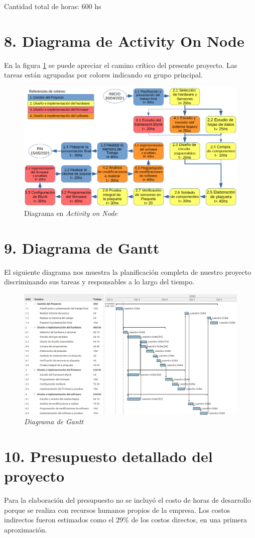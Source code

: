 \documentclass[
11pt, %
]{charter}
\begin{document}
Cantidad total de horas: 600 hs
\pagebreak
\section{8. Diagrama de Activity On Node}
\label{sec:AoN}
En la figura \ref{fig:AoN} se puede apreciar el camino crítico del presente proyecto. Las tareas están agrupadas por colores indicando su grupo principal.

\begin{figure}[htpb]
\centering 
\includegraphics[angle=90, width=.6\textwidth]{./Figuras/AoN.png}
\caption{Diagrama en \textit{Activity on Node}}
\label{fig:AoN}
\end{figure}

\section{9. Diagrama de Gantt}
\label{sec:gantt}

El siguiente diagrama nos muestra la planificación completa de nuestro proyecto discriminando sus tareas y responsables a lo largo del tiempo.

\begin{figure}[htpb]
\centering 
\includegraphics[angle=90, width=.85\textwidth]{./Figuras/gantt.png}
\caption{\textit{Diagrama de Gantt}}
\label{fig:gantt}
\end{figure}

\section{10. Presupuesto detallado del proyecto}
\label{sec:presupuesto}
Para la elaboración del presupuesto no se incluyó el costo de horas de desarrollo porque se realiza con recursos humanos propios de la empresa. Los costos indirectos fueron estimados como el 29\% de los costos directos, en una primera aproximación.
\end{document}
